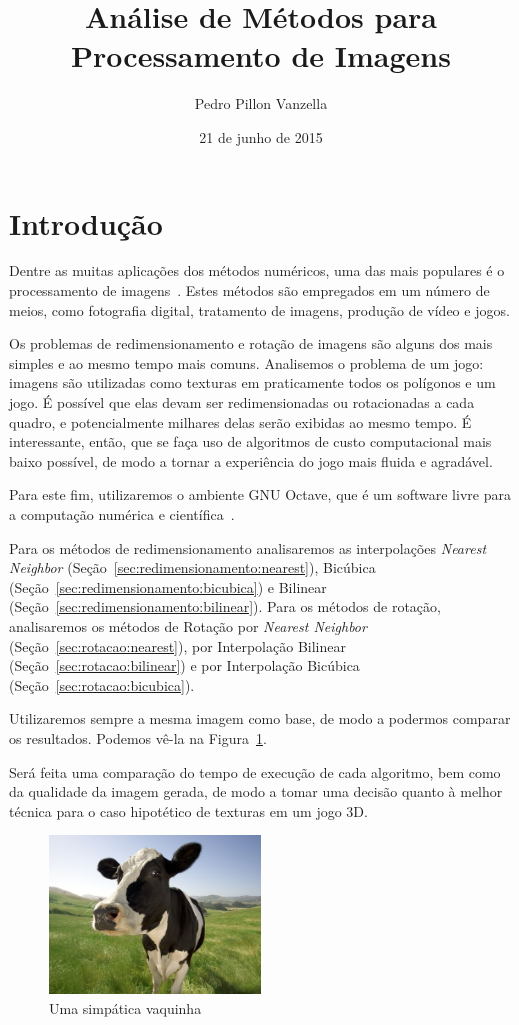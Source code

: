 \documentclass[12pt]{article}
\title{Análise de Métodos para Processamento de Imagens}
\author{Pedro Pillon Vanzella}
\date{21 de junho de 2015}
\begin{document}
 

\maketitle
     
\section{Introdução}\label{sec:introducao}

Dentre as muitas aplicações dos métodos numéricos, uma das mais populares é o processamento de imagens~\cite{acharya:2005}. Estes métodos são empregados em um número de meios, como fotografia digital, tratamento de imagens, produção de vídeo e jogos.

Os problemas de redimensionamento e rotação de imagens são alguns dos mais simples e ao mesmo tempo mais comuns. Analisemos o problema de um jogo: imagens são utilizadas como texturas em praticamente todos os polígonos e um jogo. É possível que elas devam ser redimensionadas ou rotacionadas a cada quadro, e potencialmente milhares delas serão exibidas ao mesmo tempo. É interessante, então, que se faça uso de algoritmos de custo computacional mais baixo possível, de modo a tornar a experiência do jogo mais fluida e agradável.

Para este fim, utilizaremos o ambiente GNU Octave, que é um software livre para a computação numérica e científica~\cite{eaton:2008}.

Para os métodos de redimensionamento analisaremos as interpolações \textit{Nearest Neighbor} (Seção~\ref{sec:redimensionamento:nearest}), Bicúbica (Seção~\ref{sec:redimensionamento:bicubica}) e Bilinear (Seção~\ref{sec:redimensionamento:bilinear}). Para os métodos de rotação, analisaremos os métodos de Rotação por \textit{Nearest Neighbor} (Seção~\ref{sec:rotacao:nearest}), por Interpolação Bilinear (Seção~\ref{sec:rotacao:bilinear}) e por Interpolação Bicúbica (Seção~\ref{sec:rotacao:bicubica}).

Utilizaremos sempre a mesma imagem como base, de modo a podermos comparar os resultados. Podemos vê-la na Figura~\ref{fig:vaca:semnada}.

Será feita uma comparação do tempo de execução de cada algoritmo, bem como da qualidade da imagem gerada, de modo a tomar uma decisão quanto à melhor técnica para o caso hipotético de texturas em um jogo 3D.

\begin{figure}[H]
\centering
\includegraphics[width=0.5\textwidth]{cow_small.png}
\caption{Uma simpática vaquinha}
\label{fig:vaca:semnada}
\end{figure}
\end{document}
